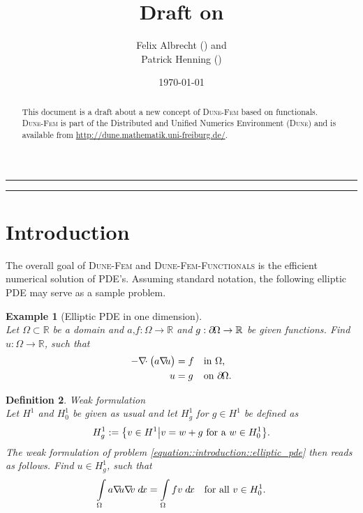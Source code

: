 \documentclass[a4paper,11pt]{article}
\title{Draft on \dunefemfunctionals}
\author{Felix Albrecht (\Code{felix.albrecht@uni-muenster.de}) and\\
  Patrick Henning (\Code{patrick.henning@uni-muenster.de})
}
\date{\today}
\numberwithin{equation}{section}
\newtheorem{definition}{Definition}[section]
\newtheorem{example}[definition]{Example}
\newcommand{\theoremNewline}{\hspace{1mm}\\}
\newcommand{\theoremEndLine}{\hspace{1mm}}
\newcommand{\dune}{\textsc{Dune}\xspace}
\newcommand{\dunefem}{\textsc{Dune-Fem}\xspace}
\newcommand{\dunefemfunctionals}{\textsc{Dune-Fem-Functionals}\xspace}
\newcommand{\hnS}{\hspace{-1.25pt}}
\newcommand{\divergence}{\nabla\hnS\hnS\hnS\cdot}
\newcommand{\gradient}{\nabla\hnS\hnS}
\newcommand{\boundary}{\partial \hnS}
\newcommand{\dx}{\;d\hnS x}
\newcommand{\komma}{\text{,}}
\newcommand{\punkt}{\text{.}}
\newcommand{\R}{\mathbb{R}}
\begin{document}
  \maketitle

  \begin{abstract}
    This document is a draft about a new concept of \dunefem based on functionals. \dunefem is part of the
    Distributed and Unified Numerics Environment (\dune) and is available from
    \url{http://dune.mathematik.uni-freiburg.de/}.
  \end{abstract}

  \hrule

  \begin{multicols}{2}
    \small\tableofcontents
  \end{multicols}

  \hrule

  \section{Introduction}

    The overall goal of \dunefem and \dunefemfunctionals is the efficient numerical solution of PDE's. Assuming standard
    notation, the following elliptic PDE may serve as a sample problem.

    \begin{example}[Elliptic PDE in one dimension]\theoremNewline
      \label{example::introduction::elliptic_pde}
      Let ${\Omega \subset \R}$ be a domain and ${a\komma f : \Omega \rightarrow \R}$ and
      ${g : \boundary\Omega \rightarrow \R}$ be given functions. Find ${u: \Omega \rightarrow \R}$, such that
      \begin{align}
        \label{equation::introduction::elliptic_pde}
        - \divergence
          \big(
            a \gradient u
          \big)
          &= f &&\text{in } \Omega \komma
        \\
        u &= g &&\text{on } \boundary\Omega \punkt
        \notag
      \end{align}
    \end{example}\theoremEndLine

    \begin{definition}{Weak formulation}\theoremNewline
      \label{definition::introduction::weak_formulation}
      Let $H^1$ and $H^1_0$ be given as usual and let $H^1_g$ for ${g\in H^1}$ be defined as
      \begin{align}
        H^1_g :=
          \big\{
            v \in H^1
          \big|
            v = w + g \text{ for a } w \in H^1_0
          \big\}\punkt
        \notag
      \end{align}
      The weak formulation of problem \eqref{equation::introduction::elliptic_pde} then reads as follows. Find
      ${u \in H^1_g}$, such that
      \begin{align}
        \label{equation::introduction::weak_formulation}
        \int\limits_{\Omega}
          a \gradient u \gradient v
        \dx
        =
        \int\limits_{\Omega}
          f v
        \dx
        &&\text{for all } v \in H^1_0 \punkt
      \end{align}
    \end{definition}
\end{document}
